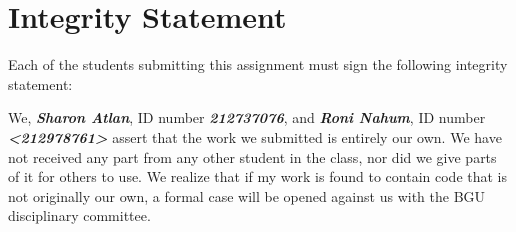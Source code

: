 \documentclass[a4paper]{article}
\theoremstyle{remarksStyle}
\theoremstyle{questionStyle}
\theoremstyle{answerStyle}
\begin{document}
\newpage
\section{Integrity Statement}
Each of the students submitting this assignment must sign the following integrity statement:

\vspace{5ex}
\begin{boxxed}
\textcolor{CB_blue}{
We, \textbf{\textit{Sharon Atlan}}, ID number \textbf{\textit{212737076}}, and \textbf{\textit{Roni Nahum}}, ID number \textbf{\textit{<212978761>}} assert that the work we submitted is entirely our own.
We have not received any part from any other student in the class, nor did we give parts of it for others to use.
We realize that if my work is found to contain code that is not originally our own, a formal case will be opened against us with the BGU disciplinary committee.
}
\end{boxxed}

\vspace{1cm}

\end{document}
